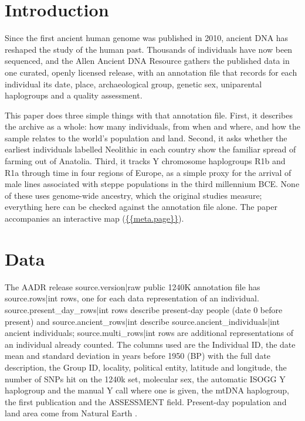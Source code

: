 \documentclass[11pt,a4paper]{article}
\begin{document}
\section{Introduction}
Since the first ancient human genome was published in 2010, ancient DNA has reshaped the study of the human past. Thousands of individuals have now been sequenced, and the Allen Ancient DNA Resource \citep{aadr,aadrpaper} gathers the published data in one curated, openly licensed release, with an annotation file that records for each individual its date, place, archaeological group, genetic sex, uniparental haplogroups and a quality assessment.

This paper does three simple things with that annotation file. First, it describes the archive as a whole: how many individuals, from when and where, and how the sample relates to the world's population and land. Second, it asks whether the earliest individuals labelled Neolithic in each country show the familiar spread of farming out of Anatolia. Third, it tracks Y chromosome haplogroups R1b and R1a through time in four regions of Europe, as a simple proxy for the arrival of male lines associated with steppe populations in the third millennium BCE. None of these uses genome-wide ancestry, which the original studies measure; everything here can be checked against the annotation file alone. The paper accompanies an interactive map (\url{{{meta.page}}}).

\section{Data}
The AADR release {{source.version|raw}} public 1240K annotation file has {{source.rows|int}} rows, one for each data representation of an individual. {{source.present_day_rows|int}} rows describe present-day people (date 0 before present) and {{source.ancient_rows|int}} describe {{source.ancient_individuals|int}} ancient individuals; {{source.multi_rows|int}} rows are additional representations of an individual already counted. The columns used are the Individual ID, the date mean and standard deviation in years before 1950 (BP) with the full date description, the Group ID, locality, political entity, latitude and longitude, the number of SNPs hit on the 1240k set, molecular sex, the automatic ISOGG Y haplogroup and the manual Y call where one is given, the mtDNA haplogroup, the first publication and the ASSESSMENT field. Present-day population and land area come from Natural Earth \citep{naturalearth}.
\end{document}
